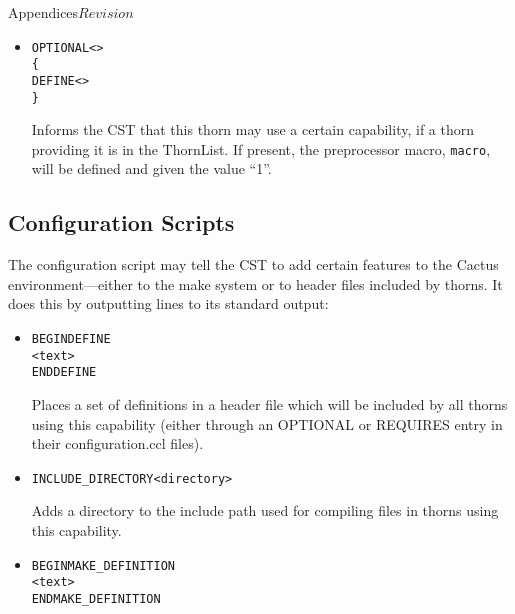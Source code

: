 \begin{cactuspart}{Appendices}{}{$Revision$}
\begin{itemize}
Example:

\begin{alltt}
REQUIRES ExampleCapability (>=2.43.2dev-1)
\end{alltt}


\item

\begin{alltt}
OPTIONAL <>
\{
  DEFINE <>
\}
\end{alltt}

Informs the CST that this thorn may use a certain capability, if a
thorn providing it is in the ThornList.  If present, the preprocessor
macro, \verb|macro|, will be defined and given the value ``1''.

\end{itemize}

\subsection{Configuration Scripts}
\label{sec:Appendix.configuration.ccl.configscript}

The configuration script may tell the CST to add certain features to
the Cactus environment---either to the make system or to header
files included by thorns.  It does this by outputting lines to its
standard output:

\begin{itemize}


\item

\begin{alltt}
BEGIN DEFINE 
<text>
END DEFINE
\end{alltt}

Places a set of definitions in a header file which will be included by
all thorns using this capability (either through an OPTIONAL or
REQUIRES entry in their configuration.ccl files).

\item

\begin{alltt}
INCLUDE_DIRECTORY  <directory>
\end{alltt}

Adds a directory to the include path used for compiling files in
thorns using this capability.

\item

\begin{alltt}
BEGIN MAKE_DEFINITION 
<text>
END MAKE_DEFINITION
\end{alltt}


\end{itemize}
\end{cactuspart}
